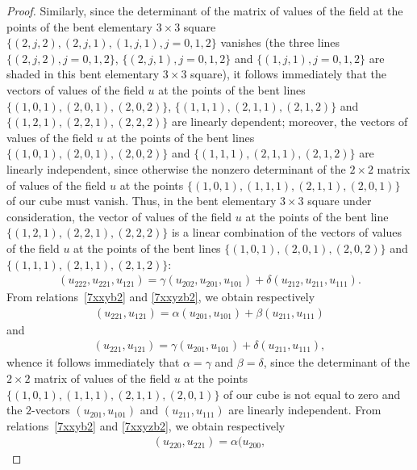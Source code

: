 \documentclass[11pt]{article}
\begin{document}
\begin{proof}
Similarly, since the determinant of the matrix of values of the
f\/ield at the points of the bent elementary $3 \times 3$ square
$\{(2, j, 2), (2, j, 1), (1, j, 1), j = 0, 1, 2\}$ vanishes (the
three lines $\{(2, j, 2), j = 0, 1, 2\}$, $\{(2, j, 1), j = 0, 1,
2\}$ and $\{(1, j, 1), j = 0, 1, 2\}$ are shaded in this bent
elementary $3 \times 3$ square), it follows immediately that the
vectors of values of the f\/ield $u$ at the points of the bent lines
$\{(1, 0, 1), (2, 0, 1), (2, 0, 2)\}$, $\{(1, 1, 1), (2, 1, 1), (2,
1, 2)\}$ and $\{(1, 2, 1), (2, 2, 1), (2, 2, 2)\}$ are linearly
dependent; moreover, the vectors of values of the f\/ield $u$ at the
points of the bent lines $\{(1, 0, 1), (2, 0, 1), (2, 0, 2)\}$ and
$\{(1, 1, 1), (2, 1, 1), (2, 1, 2)\}$ are linearly independent,
since otherwise the nonzero determinant of the $2 \times 2$ matrix
of values of the f\/ield $u$ at the points $\{(1, 0, 1), (1, 1, 1),
(2, 1, 1), (2, 0, 1)\}$ of our cube must vanish. Thus, in the bent
elementary $3 \times 3$ square under consideration, the vector of
values of the f\/ield $u$ at the points of the bent line $\{(1, 2, 1),
(2, 2, 1), (2, 2, 2)\}$ is a linear combination of the vectors of
values of the f\/ield $u$ at the points of the bent lines $\{(1, 0,
1), (2, 0, 1), (2, 0, 2)\}$ and $\{(1, 1, 1), (2, 1, 1), (2, 1,
2)\}$:  \begin{gather} (u_{2 2 2}, u_{2 2 1}, u_{1 2 1}) = \gamma (u_{2 0 2},
u_{2 0 1}, u_{1 0 1}) + \delta (u_{2 1 2}, u_{2 1 1}, u_{1 1 1}).
\label{7xxyzb2} \end{gather} From relations~\eqref{7xxyb2} and
\eqref{7xxyzb2}, we obtain respectively
\begin{gather*} (u_{2 2 1}, u_{1 2 1}) =
\alpha (u_{2 0 1}, u_{1 0 1}) + \beta (u_{2 1 1}, u_{1 1 1})
\end{gather*} and
\begin{gather*}
(u_{2 2 1}, u_{1 2 1}) = \gamma (u_{2 0
1}, u_{1 0 1}) + \delta (u_{2 1 1}, u_{1 1 1}),
\end{gather*}
whence it follows immediately that $\alpha = \gamma$ and $\beta =
\delta$, since the determinant of the $2 \times 2$ matrix of values
of the f\/ield $u$ at the points $\{(1, 0, 1), (1, 1, 1), (2, 1, 1),
(2, 0, 1)\}$ of our cube is not equal to zero and the $2$-vectors
$(u_{2 0 1}, u_{1 0 1})$ and $(u_{2 1 1}, u_{1 1 1})$ are linearly
independent. From relations~\eqref{7xxyb2} and \eqref{7xxyzb2}, we
obtain respectively
\begin{gather} (u_{2 2 0}, u_{2 2 1}) = \alpha (u_{2 0 0},

\end{gather}
\end{proof}
\end{document}
